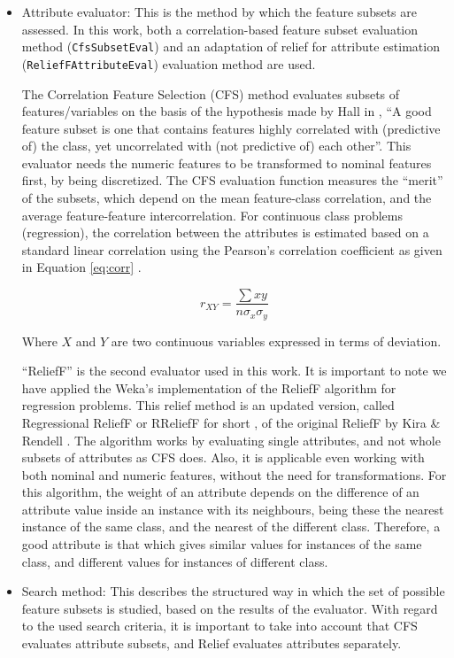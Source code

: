 \documentclass[a4paper,10pt,twocolumn,preprint,3p]{elsarticle}
\begin{document}
\begin{itemize}
  \item Attribute evaluator: This is the method by which the feature subsets are assessed. In this work, both a correlation-based feature subset evaluation method ({\tt CfsSubsetEval}) and an adaptation of relief for attribute estimation ({\tt ReliefFAttributeEval}) evaluation method are used. 
  
  The Correlation Feature Selection (CFS) method evaluates subsets of features/variables on the basis of the hypothesis made by Hall in \cite{Hall1998}, ``A  good  feature  subset  is  one  that  contains  features  highly  correlated  with
(predictive of) the class, yet uncorrelated with (not predictive of) each other''. This evaluator needs the numeric features to be transformed to nominal features first, by being discretized.%
 The CFS evaluation function measures the ``merit'' of the subsets, which depend on the mean feature-class correlation, and the average feature-feature intercorrelation. For continuous class problems (regression), the correlation between the attributes is estimated based on a standard linear correlation
using the Pearson's correlation coefficient as given in Equation \ref{eq:corr} \cite{hall2000correlation}. 

\begin{equation}
r_{XY}=\frac{\sum xy}{n\sigma_{x}\sigma_{y}}
\label{eq:corr}
\end{equation}


Where $X$ and $Y$ are two continuous variables expressed in terms
of deviation. 

``ReliefF'' is the second evaluator used in this work. It is important to note 
we have applied the Weka's implementation of the ReliefF algorithm for regression problems. This relief method is an updated version, called Regressional ReliefF or RReliefF for short \cite{RobnikSikonja1997}, of the original ReliefF by Kira \& Rendell \cite{Kira1992}. The algorithm works by evaluating single attributes, and not whole subsets of attributes as CFS does. Also, it is applicable even working with both nominal and numeric features, without the need for transformations. For this algorithm, the weight of an attribute depends on the difference of an attribute value inside an instance with its neighbours, being these the nearest instance of the same class, and the nearest of the different class. Therefore, a good attribute is that which gives similar values for instances of the same class, and different values for instances of different class.
  \item Search method: This describes the structured way in which the set of possible feature subsets is studied, based on the results of the evaluator. With regard to the used search criteria, it is important to take into account that CFS evaluates attribute subsets, and Relief evaluates attributes separately.


\end{itemize}
\end{document}
